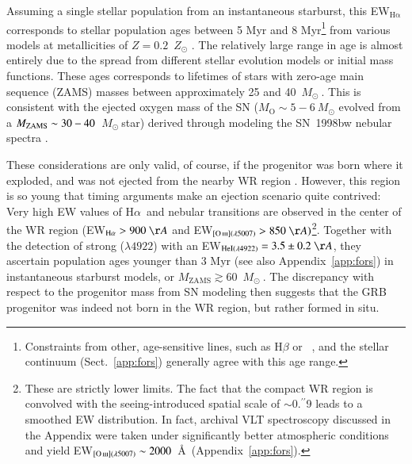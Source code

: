 \documentclass[traditabstract]{aa}
\newcommand{\farc}{\hbox{$.\!\!^{\prime\prime}$}}
\newcommand{\ha}{H$\alpha$}
\newcommand{\hei}{\ion{He}{i}}
\newcommand{\oiii}{[\ion{O}{iii}]}
\newcommand{\Msun}{$M_\odot~$}
\begin{document}
Assuming a single stellar population from an instantaneous starburst, this EW$_{\mathrm{H\alpha}}$ corresponds to stellar population ages between 5 Myr and 8 Myr\footnote{{Constraints from other, age-sensitive lines, such as H$\beta$ or \hei~\citep{1999ApJS..125..489G}, and the stellar continuum (Sect.~\ref{app:fors}) generally agree with this age range.}} from various models at metallicities of $Z=0.2$~$Z_{\odot}$ \citep[see, e.g.,][and references therein]{2013ApJ...779..170L, 2016arXiv160703446K}. The relatively large range in age is almost entirely due to the spread from different stellar evolution models or initial mass functions. These ages corresponds to lifetimes of stars with zero-age main sequence (ZAMS) masses between approximately 25 and 40~\Msun \citep{1994A&AS..105...29F, 2005A&A...429..581M}. This is consistent with the ejected oxygen mass of the SN ($M_{\mathrm{O}}\sim5-6~M_{\odot}$ evolved from a $M_{\rm{ZAMS}} \sim 30-40$~\Msun star) derived through modeling the SN~1998bw nebular spectra \citep{2001ApJ...559.1047M, 2006ApJ...640..854M}.



These considerations are only valid, of course, if the progenitor was born where it exploded, and was not ejected from the nearby WR region \citep{2006A&A...454..103H}. However, this region is so young that timing arguments make an ejection scenario quite contrived: Very high EW values of \ha~and nebular transitions are observed in the center of the WR region (EW$_{\mathrm{H\alpha}}>900~\AA$ and EW$_{\oiii(\lambda5007)}>850~\AA)$\footnote{These are strictly lower limits. The fact that the compact WR region is convolved with the seeing-introduced spatial scale of $\sim$0\farc{9} leads to a smoothed EW distribution. In fact, archival VLT spectroscopy discussed in the Appendix were taken under significantly better atmospheric conditions and yield EW$_{\oiii(\lambda5007)}\sim2000$~\AA~(Appendix~\ref{app:fors}).}. {Together with the detection of strong \hei($\lambda4922$) with an EW$_{\mathrm{HeI(\lambda4922)}}=3.5\pm0.2~\AA$}, they ascertain population ages younger than 3 Myr (see also Appendix~\ref{app:fors}) in instantaneous starburst models, or $M_{\mathrm{ZAMS}} \gtrsim 60$~\Msun \citep[see, e.g.,][and references therein for a similar case]{2015MNRAS.451L..65T}. The discrepancy with respect to the progenitor mass from SN modeling \citep[e.g.,][]{2001ApJ...559.1047M, 2006ApJ...640..854M} then suggests that the GRB progenitor was indeed not born in the WR region, but rather formed in situ.
\end{document}
